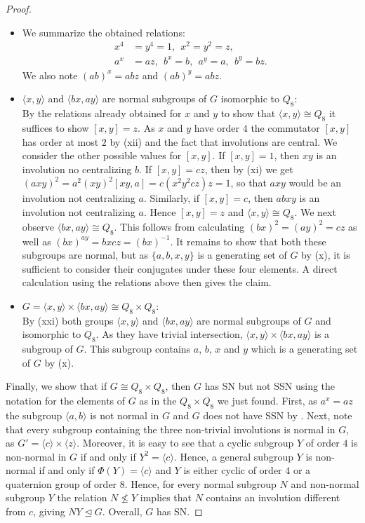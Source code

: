 \documentclass[a4paper,10pt]{amsart}
\theoremstyle{definition}
\theoremstyle{remark}
\begin{document}
\begin{proof}
\begin{itemize}
\item[Relations] We summarize the obtained relations:
\begin{align*}
x^4 &= y^4 = 1, \ \ x^2 = y^2 = z, \\
a^x &= az, \ \ b^x = b, \ \ a^y = a, \ \ b^y = bz.
\end{align*}
We also note $(ab)^x = abz$ and $(ab)^y = abz$.

\item[(xxi)] $\langle x, y \rangle$ and $\langle bx, ay \rangle$ are normal subgroups of $G$ isomorphic to $Q_8$:\\
By the relations already obtained for $x$ and $y$ to show that $\langle x,y \rangle \cong Q_8$ it suffices to show $[x,y] = z$. As $x$ and $y$ have order $4$ the commutator $[x,y]$ has order at most $2$ by (xii) and the fact that involutions are central. We consider the other possible values for $[x,y]$. If $[x,y]=1$, then $xy$ is an involution no centralizing $b$. If $[x,y] = cz$, then by (xi) we get $(axy)^2 = a^2 (xy)^2 [xy,a] = c (x^2y^2cz)z = 1$, so that $axy$ would be an involution not centralizing $a$. Similarly, if $[x,y] = c$, then $abxy$ is an involution not centralizing $a$. Hence $[x,y] = z$ and $\langle x,y \rangle \cong Q_8$. We next observe $\langle bx, ay \rangle \cong Q_8$. This follows from calculating $(bx)^2 = (ay)^2 = cz$ as well as $(bx)^{ay} = bxcz = (bx)^{-1}$. It remains to show that both these subgroups are normal, but as $\{a,b,x,y \}$ is a generating set of $G$ by (x), it is sufficient to consider their conjugates under these four elements. A direct calculation using the relations above then gives the claim.

\item[(xxii)] $G = \langle x,y \rangle \times \langle bx, ay \rangle \cong Q_8 \times Q_8$:\\
By (xxi) both groups $\langle x,y \rangle$ and $\langle bx, ay \rangle$ are normal subgroups of $G$ and isomorphic to $Q_8$. As they have trivial intersection, $\langle x,y \rangle \times \langle bx, ay \rangle$ is a subgroup of $G$. This subgroup contains $a$, $b$, $x$ and $y$ which is a generating set of $G$ by (x).
\end{itemize} 

Finally, we show that if $G \cong Q_8 \times Q_8$, then $G$ has SN but not SSN using the notation for the elements of $G$ as in the $Q_8 \times Q_8$ we just found. First, as $a^x = az$ the subgroup $\langle a, b \rangle$ is not normal in $G$ and $G$ does not have SSN by . Next, note that every subgroup containing the three non-trivial involutions is normal in $G$, as $G' = \langle c \rangle \times \langle z \rangle$. Moreover, it is easy to see that a cyclic subgroup $Y$ of order $4$ is non-normal in $G$ if and only if $Y^2 = \langle c \rangle$. Hence, a general subgroup $Y$ is non-normal if and only if $\Phi(Y) = \langle c \rangle$ and $Y$ is either cyclic of order $4$ or a quaternion group of order $8$. Hence, for every normal subgroup $N$ and non-normal subgroup $Y$ the relation $N \not\leq Y$ implies that $N$ contains an involution different from $c$, giving $NY \unlhd G$. Overall, $G$ has SN. 
\end{proof}
\end{document}
